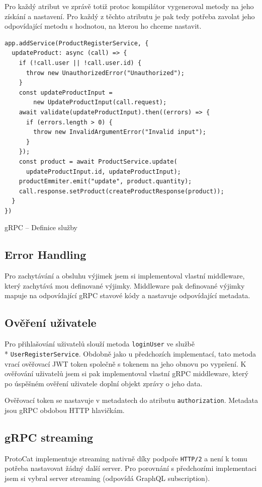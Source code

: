 \documentclass[thesis=M,czech]{FITthesis}[2019/12/23]
\begin{document}
Pro každý atribut ve zprávě totiž protoc kompilátor vygeneroval metody na jeho získání a nastavení. Pro každý z těchto atributu je pak tedy potřeba zavolat jeho odpovídající metodu s hodnotou, na kterou ho chceme nastavit.

\begin{listing}
\begin{verbatim}
app.addService(ProductRegisterService, {
  updateProduct: async (call) => {
    if (!call.user || !call.user.id) {
      throw new UnauthorizedError("Unauthorized");
    }
    const updateProductInput = 
        new UpdateProductInput(call.request);
    await validate(updateProductInput).then((errors) => {
      if (errors.length > 0) {
        throw new InvalidArgumentError("Invalid input");
      }
    });
    const product = await ProductService.update(
      updateProductInput.id, updateProductInput);
    productEmmiter.emit("update", product.quantity);
    call.response.setProduct(createProductResponse(product));
  }
})
\end{verbatim}
\caption{gRPC -- Definice služby}
\label{lst:grpc_service}
\end{listing}

\subsection{Error Handling}
Pro zachytávání a obsluhu výjimek jsem si implementoval vlastní middleware, který zachytává mou definované výjimky. Middleware pak definované výjimky mapuje na odpovídající gRPC stavové kódy a nastavuje odpovídající metadata.

\subsection{Ověření uživatele}
Pro přihlašování uživatelů slouží metoda \texttt{loginUser} ve službě \\* \texttt{UserRegisterService}. Obdobně jako u předchozích implementací, tato metoda vrací ověřovací JWT token společně s tokenem na jeho obnovu po vypršení. K ověřování uživatelů jsem si pak implementoval vlastní gRPC middleware, který po úspěšném ověření uživatele doplní objekt zprávy o jeho data.

Ověřovací token se nastavuje v metadatech do atributu \texttt{authorization}. Metadata jsou gRPC obdobou HTTP hlavičkám.

\subsection{gRPC streaming}
ProtoCat implementuje streaming nativně díky podpoře \texttt{HTTP/2} a není k tomu potřeba nastavovat žádný další server. Pro porovnání s předchozími implementaci jsem si vybral server streaming (odpovídá GraphQL subscription).
\end{document}
